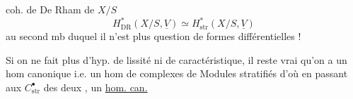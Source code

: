 coh. de De Rham de $X/S$
\[
H^*_{\mathrm{DR}}(X/S,\underline V)\simeq H^*_{\mathrm{str}}(X/S,\underline V)
\]
au second mb duquel il n'est plus question de  formes différentielles !

Si on ne fait plus d'hyp. de lissité ni de caractéristique, il reste vrai qu'on a un hom canonique 
i.e. un hom de complexes de Modules stratifiés
d'où en passant aux $C^\bullet_{\mathrm{str}}$ des deux , un \uline{hom. can.}
